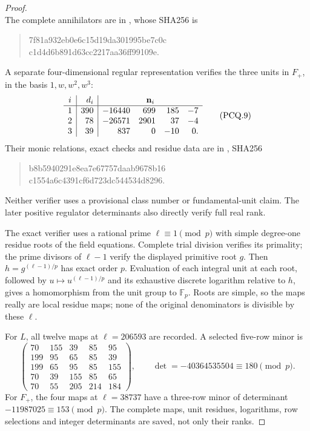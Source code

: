 \begin{proof}
\[\tag{PCQ.8}
\]
The complete annihilators are in
, whose SHA256 is
\begin{quote}\ttfamily\small
7f81a932eb0e6c15d19da301995be7c0c\\
c1d4d6b891d63cc2217aa36ff99109e.
\end{quote}
A separate four-dimensional regular representation verifies the
three units in $F_+$, in the basis $1,w,w^2,w^3$:
\[
 \begin{array}{c|r|rrrr}
 i&d_i&\multicolumn{4}{c}{\mathbf n_i}\\ \hline
 1&390&-16440&699&185&-7\\
 2&78&-26571&2901&37&-4\\
 3&39&837&0&-10&0.
 \end{array}
 \tag{PCQ.9}
\]
Their monic relations, exact checks and residue data are in
, SHA256
\begin{quote}\ttfamily\small
b8b5940291e8ea7e67757daab9678b16\\
c1554a6c4391cf6d723dc544534d8296.
\end{quote}
Neither verifier uses a provisional class number or fundamental-unit
claim.  The later positive regulator determinants also directly
verify full real rank.

The exact verifier uses a rational prime $\ell\equiv1\pmod p$
with simple degree-one residue roots of the field equations.
Complete trial division verifies its primality; the prime divisors
of $\ell-1$ verify the displayed primitive root $g$.
Then $h=g^{(\ell-1)/p}$ has exact order $p$.
Evaluation of each integral unit at each root, followed by
$u\mapsto u^{(\ell-1)/p}$ and its exhaustive discrete logarithm
relative to $h$, gives a homomorphism from the unit group to
$\mathbb F_p$.  Roots are simple, so the maps really are local
residue maps; none of the original denominators is divisible by
these $\ell$.

For $L$, all twelve maps at $\ell=206593$ are recorded.
A selected five-row minor is
\[
 \begin{pmatrix}
 70&155&39&85&95\\
 199&95&65&85&39\\
 199&65&95&85&155\\
 70&39&155&85&65\\
 70&55&205&214&184
 \end{pmatrix},\qquad
 \det=-40364535504\equiv180\pmod p.
 \tag{PCQ.10}
\]
For $F_+$, the four maps at $\ell=38737$ have a three-row
minor of determinant $-11987025\equiv153\pmod p$.
The complete maps, unit residues, logarithms, row selections
and integer determinants are saved, not only their ranks.


\end{proof}
